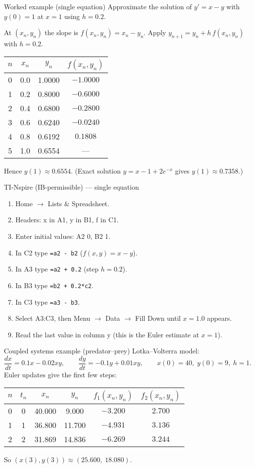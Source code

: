 \documentclass[11pt]{article}
\def\textbf#1{#1}%
\def\texttt#1{#1}%
\begin{document}
\textbf{Worked example (single equation)}
Approximate the solution of $y'=x-y$ with $y(0)=1$ at $x=1$ using $h=0.2$.

\noindent At $(x_n,y_n)$ the slope is $f(x_n,y_n)=x_n-y_n$. Apply
$y_{n+1}=y_n+h\,f(x_n,y_n)$ with $h=0.2$.

\begin{center}
\begin{tabular}{c c c c}
\hline
$n$ & $x_n$ & $y_n$ & $f(x_n,y_n)$ \\
\hline
0 & 0.0 & 1.0000 & $-1.0000$ \\
1 & 0.2 & 0.8000 & $-0.6000$ \\
2 & 0.4 & 0.6800 & $-0.2800$ \\
3 & 0.6 & 0.6240 & $-0.0240$ \\
4 & 0.8 & 0.6192 & $0.1808$ \\
5 & 1.0 & 0.6554 & --- \\
\hline
\end{tabular}
\end{center}

Hence $y(1)\approx 0.6554$.
(Exact solution $y=x-1+2e^{-x}$ gives $y(1)\approx0.7358$.)

\textbf{TI-Nspire (IB-permissible) — single equation}
\begin{enumerate}
  \item \textbf{Home} $\rightarrow$ \textbf{Lists \& Spreadsheet}.
  \item Headers: \texttt{x} in A1, \texttt{y} in B1, \texttt{f} in C1.
  \item Enter initial values: A2 \texttt{0}, B2 \texttt{1}.
  \item In C2 type \verb|=a2 - b2| \quad ($f(x,y)=x-y$).
  \item In A3 type \verb|=a2 + 0.2| \quad (step $h=0.2$).
  \item In B3 type \verb|=b2 + 0.2*c2|.
  \item In C3 type \verb|=a3 - b3|.
  \item Select A3:C3, then \textbf{Menu} $\rightarrow$ \textbf{Data} $\rightarrow$ \textbf{Fill Down} until $x=1.0$ appears.
  \item Read the last value in column \texttt{y} (this is the Euler estimate at $x=1$).
\end{enumerate}

\textbf{Coupled systems example (predator–prey)}
Lotka–Volterra model:
\[
\frac{dx}{dt}=0.1x-0.02xy,\qquad
\frac{dy}{dt}=-0.1y+0.01xy,\qquad
x(0)=40,\;y(0)=9,\;h=1.
\]
Euler updates give the first few steps:
\begin{center}
\begin{tabular}{c c c c c c}
\hline
$n$ & $t_n$ & $x_n$ & $y_n$ & $f_1(x_n,y_n)$ & $f_2(x_n,y_n)$\\
\hline
0 & 0 & 40.000 & 9.000 & $-3.200$ & $2.700$ \\
1 & 1 & 36.800 & 11.700 & $-4.931$ & $3.136$ \\
2 & 2 & 31.869 & 14.836 & $-6.269$ & $3.244$ \\
\hline
\end{tabular}
\end{center}
So $(x(3),y(3))\approx(25.600,\;18.080)$.
\end{document}
